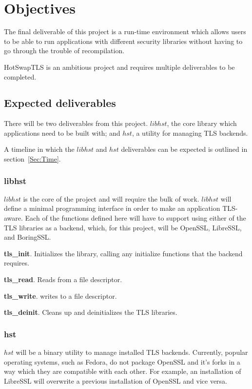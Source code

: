 \documentclass{acm_proc_article-sp}
\begin{document}
\section{Objectives}\label{Sec:Obj}

The final deliverable of this project is a run-time environment which allows
users to be able to run applications with different security libraries without
having to go through the trouble of recompilation.

HotSwapTLS is an ambitious project and requires multiple deliverables to be
completed.

\subsection{Expected deliverables}\label{Sec:Deliver}

There will be two deliverables from this project. $libhst$, the core library
which applications need to be built with; and $hst$, a utility for managing TLS
backends.

A timeline in which the $libhst$ and $hst$ deliverables can be expected is outlined
in section~\ref{Sec:Time}.

\subsubsection{libhst}

$libhst$ is the core of the project and will require the bulk of work. $libhst$
will define a minimal programming interface in order to make an application
TLS-aware. Each of the functions defined here will have to support using either
of the TLS libraries as a backend, which, for this project, will be OpenSSL,
LibreSSL, and BoringSSL.

\textbf{tls\_init}. Initializes the library, calling any initialize functions
that the backend requires.

\textbf{tls\_read}. Reads from a file descriptor.

\textbf{tls\_write}. writes to a file descriptor.

\textbf{tls\_deinit}. Cleans up and deinitializes the TLS libraries.

\subsubsection{hst}

$hst$ will be a binary utility to manage installed TLS backends. Currently,
popular operating systems, such as Fedora, do not package OpenSSL and it's forks
in a way which they are compatible with each other. For example, an installation
of LibreSSL will overwrite a previous installation of OpenSSL and vice versa.
\end{document}
